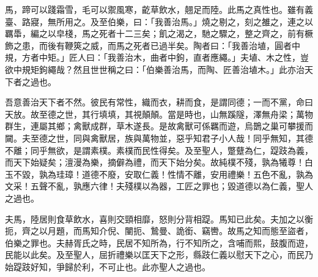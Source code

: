 
\begin{pinyinscope}
馬，蹄可以踐霜雪，毛可以禦風寒，齕草飲水，翹足而陸。此馬之真性也。雖有義臺、路寢，無所用之。及至伯樂，曰：「我善治馬。」燒之剔之，刻之雒之，連之以羈馽，編之以皁棧，馬之死者十二三矣；飢之渴之，馳之驟之，整之齊之，前有橛飾之患，而後有鞭筴之威，而馬之死者已過半矣。陶者曰：「我善治埴，圓者中規，方者中矩。」匠人曰：「我善治木，曲者中鉤，直者應繩。」夫埴、木之性，豈欲中規矩鉤繩哉？然且世世稱之曰：「伯樂善治馬，而陶、匠善治埴木。」此亦治天下者之過也。

吾意善治天下者不然。彼民有常性，織而衣，耕而食，是謂同德；一而不黨，命曰天放。故至德之世，其行填填，其視顛顛。當是時也，山無蹊隧，澤無舟梁；萬物群生，連屬其鄉；禽獸成群，草木遂長。是故禽獸可係羈而遊，烏鵲之巢可攀援而闚。夫至德之世，同與禽獸居，族與萬物並，惡乎知君子小人哉！同乎無知，其德不離；同乎無欲，是謂素樸。素樸而民性得矣。及至聖人，蹩躠為仁，踶跂為義，而天下始疑矣；澶漫為樂，摘僻為禮，而天下始分矣。故純樸不殘，孰為犧尊！白玉不毀，孰為珪璋！道德不廢，安取仁義！性情不離，安用禮樂！五色不亂，孰為文采！五聲不亂，孰應六律！夫殘樸以為器，工匠之罪也；毀道德以為仁義，聖人之過也。

夫馬，陸居則食草飲水，喜則交頸相靡，怒則分背相踶。馬知已此矣。夫加之以衡扼，齊之以月題，而馬知介倪、闉扼、鷙曼、詭銜、竊轡。故馬之知而態至盜者，伯樂之罪也。夫赫胥氏之時，民居不知所為，行不知所之，含哺而熙，鼓腹而遊，民能以此矣。及至聖人，屈折禮樂以匡天下之形，縣跂仁義以慰天下之心，而民乃始踶跂好知，爭歸於利，不可止也。此亦聖人之過也。


\end{pinyinscope}